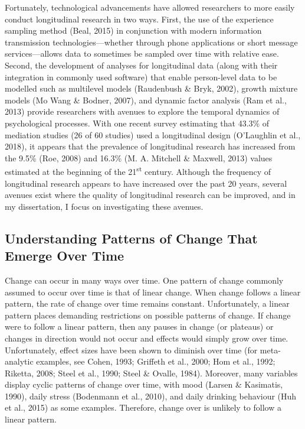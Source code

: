 \documentclass[
  english,
  man,floatsintext]{apa7}
\begin{document}
Fortunately, technological advancements have allowed researchers to more easily conduct longitudinal research in two ways. First, the use of the experience sampling method (Beal, 2015) in conjunction with modern information transmission technologies---whether through phone applications or short message services---allows data to sometimes be sampled over time with relative ease. Second, the development of analyses for longitudinal data (along with their integration in commonly used software) that enable person-level data to be modelled such as multilevel models (Raudenbush \& Bryk, 2002), growth mixture models (Mo Wang \& Bodner, 2007), and dynamic factor analysis (Ram et al., 2013) provide researchers with avenues to explore the temporal dynamics of psychological processes. With one recent survey estimating that 43.3\% of mediation studies (26 of 60 studies) used a longitudinal design (O'Laughlin et al., 2018), it appears that the prevalence of longitudinal research has increased from the 9.5\% (Roe, 2008) and 16.3\% (M. A. Mitchell \& Maxwell, 2013) values estimated at the beginning of the 21\textsuperscript{st} century. Although the frequency of longitudinal research appears to have increased over the past 20 years, several avenues exist where the quality of longitudinal research can be improved, and in my dissertation, I focus on investigating these avenues.

\hypertarget{understanding-patterns-of-change-that-emerge-over-time}{%
\subsection{Understanding Patterns of Change That Emerge Over Time}\label{understanding-patterns-of-change-that-emerge-over-time}}

Change can occur in many ways over time. One pattern of change commonly assumed to occur over time is that of linear change. When change follows a linear pattern, the rate of change over time remains constant. Unfortunately, a linear pattern places demanding restrictions on possible patterns of change. If change were to follow a linear pattern, then any pauses in change (or plateaus) or changes in direction would not occur and effects would simply grow over time. Unfortunately, effect sizes have been shown to diminish over time (for meta-analytic examples, see Cohen, 1993; Griffeth et al., 2000; Hom et al., 1992; Riketta, 2008; Steel et al., 1990; Steel \& Ovalle, 1984). Moreover, many variables display cyclic patterns of change over time, with mood (Larsen \& Kasimatis, 1990), daily stress (Bodenmann et al., 2010), and daily drinking behaviour (Huh et al., 2015) as some examples. Therefore, change over is unlikely to follow a linear pattern.
\end{document}
